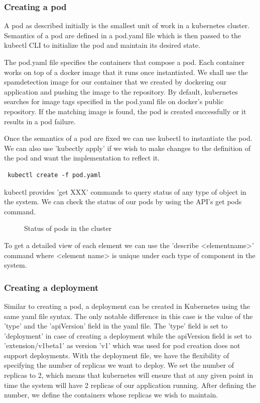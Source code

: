 \documentclass[9pt,twocolumn,twoside]{../../styles/osajnl}
\begin{document}
\subsubsection{Creating a pod}
A pod as described initially is the smallest unit of work in a
kubernetes cluster. Semantics of a pod are defined in a pod.yaml file
which is then passed to the kubectl CLI to initialize the pod and
maintain its desired state.

The pod.yaml file specifies the containers that compose a pod. Each
container works on top of a docker image that it runs once
instantiated. We shall use the spamdetection image for our container
that we created by dockering our application and pushing the image to
the repository. By default, kubernetes searches for image tags
specified in the pod.yaml file on docker's public repository. If the
matching image is found, the pod is created successfully or it results
in a pod failure.

Once the semantics of a pod are fixed we can use kubectl to
instantiate the pod. We can also use 'kubectly apply' if we wish to
make changes to the definition of the pod and want the implementation
to reflect it.

\begin{verbatim}
 kubectl create -f pod.yaml
\end{verbatim}

kubectl provides 'get XXX' commands to query status of any type of
object in the system. We can check the status of our pods by using the
API's get pods command.

\begin{figure}[htbp]
\centering
{}
\caption{Status of pods in the cluster}
\label{Status of pods in the cluster}
\end{figure}

To get a detailed view of each element we can use the 'describe
<element\textunderscore name>' command where <element\textunderscore
name> is unique under each type of component in the system.


\subsubsection{Creating a deployment}
Similar to creating a pod, a deployment can be created in Kubernetes
using the same yaml file syntax. The only notable difference in this
case is the value of the 'type' and the 'apiVersion' field in the yaml
file. The 'type' field is set to 'deployment' in case of creating a
deployment while the apiVersion field is set to 'extension/v1beta1' as
version 'v1' which was used for pod creation does not support
deployments.  With the deployment file, we have the flexibility of
specifying the number of replicas we want to deploy. We set the number
of replicas to 2, which means that kubernetes will ensure that at any
given point in time the system will have 2 replicas of our application
running. After defining the number, we define the containers whose
replicas we wish to maintain.
\end{document}
